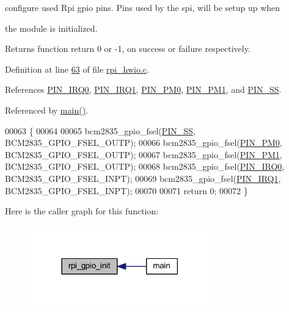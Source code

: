  

configure used Rpi gpio pins. Pins used by the spi, will be setup up when \par
 the module is initialized.

\begin{DoxyReturn}{Returns}
function return 0 or -\/1, on success or failure respectively. 

 
\end{DoxyReturn}


Definition at line \hyperlink{a00038_source_l00063}{63} of file \hyperlink{a00038_source}{rpi\-\_\-hwio.\-c}.



References \hyperlink{a00039_source_l00015}{P\-I\-N\-\_\-\-I\-R\-Q0}, \hyperlink{a00039_source_l00016}{P\-I\-N\-\_\-\-I\-R\-Q1}, \hyperlink{a00039_source_l00013}{P\-I\-N\-\_\-\-P\-M0}, \hyperlink{a00039_source_l00014}{P\-I\-N\-\_\-\-P\-M1}, and \hyperlink{a00039_source_l00010}{P\-I\-N\-\_\-\-S\-S}.



Referenced by \hyperlink{a00035_source_l00198}{main()}.


\begin{DoxyCode}
00063                           \{
00064     
00065         bcm2835\_gpio\_fsel(\hyperlink{a00039_ab4b553591a495409d4f7cec4b6c3e754}{PIN\_SS},  BCM2835\_GPIO\_FSEL\_OUTP);
00066         bcm2835\_gpio\_fsel(\hyperlink{a00039_aef7884a448449013ba1f8b46b8df5c05}{PIN\_PM0},  BCM2835\_GPIO\_FSEL\_OUTP);
00067         bcm2835\_gpio\_fsel(\hyperlink{a00039_a93e6f13f663a3ca8bcf6efe2022c9b78}{PIN\_PM1},  BCM2835\_GPIO\_FSEL\_OUTP);
00068         bcm2835\_gpio\_fsel(\hyperlink{a00039_a99ed780c4dd8d2e01c5ff66064306abf}{PIN\_IRQ0}, BCM2835\_GPIO\_FSEL\_INPT);
00069         bcm2835\_gpio\_fsel(\hyperlink{a00039_a14204df3192ece77fc1b651c6625bc30}{PIN\_IRQ1}, BCM2835\_GPIO\_FSEL\_INPT);
00070             
00071 \textcolor{keywordflow}{return} 0;   
00072 \}
\end{DoxyCode}


Here is the caller graph for this function\-:\nopagebreak
\begin{figure}[H]
\begin{center}
\leavevmode
\includegraphics[width=222pt]{dd/dad/a00005_ga156b48448f55534a2f9c805a1f760efa_icgraph}
\end{center}
\end{figure}



